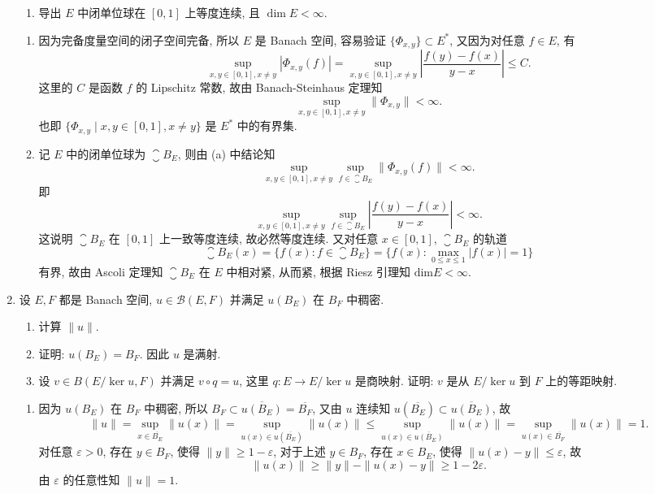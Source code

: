 \begin{enumerate}
\begin{enumerate}
      \item 导出 $E$ 中闭单位球在 $[0,1]$ 上等度连续, 且 $\dim E<\infty$.
    \end{enumerate}
    \begin{answer}
      \begin{enumerate}
        \item 因为完备度量空间的闭子空间完备, 所以 $E$ 是 Banach 空间,
        容易验证 $\{\varPhi_{x,y}\}\subset E^*$, 又因为对任意 $f\in E$, 有
        \[\sup_{x,y\in[0,1],x\neq y}|\varPhi_{x,y}(f)|=\sup_{x,y\in[0,1],x\neq y}\left|\frac{f(y)-f(x)}{y-x}\right|\leq C.\]
        这里的 $C$ 是函数 $f$ 的 Lipschitz 常数, 故由 Banach-Steinhaus 定理知
        \[\sup_{x,y\in[0,1],x\neq y}\|\varPhi_{x,y}\|<\infty.\]
        也即 $\{\varPhi_{x,y}\mid x,y\in[0,1],x\neq y\}$ 是 $E^*$ 中的有界集.
    
        \item 记 $E$ 中的闭单位球为 $\closure{B_E}$, 则由 (a) 中结论知
        \[\sup_{x,y\in[0,1],x\neq y}\sup_{f\in \closure{B_E}}\|\varPhi_{x,y}(f)\|<\infty.\]
        即
        \[\sup_{x,y\in[0,1],x\neq y}\sup_{f\in \closure{B_E}}\left|\frac{f(y)-f(x)}{y-x}\right|<\infty.\]
        这说明 $\closure{B_E}$ 在 $[0,1]$ 上一致等度连续, 故必然等度连续.
        又对任意 $x\in[0,1]$, $\closure{B_E}$ 的轨道
        \[\closure{B_E}(x)=\{f(x):f\in \closure{B_E}\}=\{f(x):\max_{0\leq x\leq 1}|f(x)|=1\}\]
        有界, 故由 Ascoli 定理知 $\closure{B_E}$ 在 $E$ 中相对紧, 从而紧, 根据 Riesz 引理知 $\textrm{dim}E<\infty$.
      \end{enumerate}
    \end{answer}
  \item 设 $E,F$ 都是 Banach 空间, $u\in\mathcal{B}(E,F)$ 并满足 $u(B_E)$ 在 $B_F$ 中稠密.

    \begin{enumerate}
        \item 计算 $\|u\|$.

        \item 证明: $u(B_E)=B_F$. 因此 $u$ 是满射.
    
        \item 设 $v\in B(E/\ker u,F)$ 并满足 $v\circ q=u$, 这里 $q:E\to E/\ker u$
        是商映射. 证明: $v$ 是从 $E/\ker u$ 到 $F$ 上的等距映射.
    \end{enumerate}
    \begin{answer}
      \begin{enumerate}
        \item 因为 $u(B_E)$ 在 $B_F$ 中稠密,
        所以 $B_F\subset\overline{u(B_E)}=\overline{B_F}$,
        又由 $u$ 连续知 $u(\overline{B_E})\subset\overline{u(B_E)}$, 故
        \[\|u\|=\sup_{x\in\overline{B_E}}\|u(x)\|=\sup_{u(x)\in u(\overline{B_E})}\|u(x)\|\leq\sup_{u(x)\in \overline{u(B_E)}}\|u(x)\|=\sup_{u(x)\in\overline{B_F}}\|u(x)\|=1.\]
        对任意 $\varepsilon>0$, 存在 $y\in B_F$,
        使得 $\|y\|\geq 1-\varepsilon$, 对于上述 $y\in B_F$, 存在 $x\in B_E$,
        使得 $\|u(x)-y\|\leq\varepsilon$, 故
        \[\|u(x)\|\geq\|y\|-\|u(x)-y\|\geq 1-2\varepsilon.\]
        由 $\varepsilon$ 的任意性知 $\|u\|=1$.
    

\end{enumerate}
\end{answer}
\end{enumerate}
